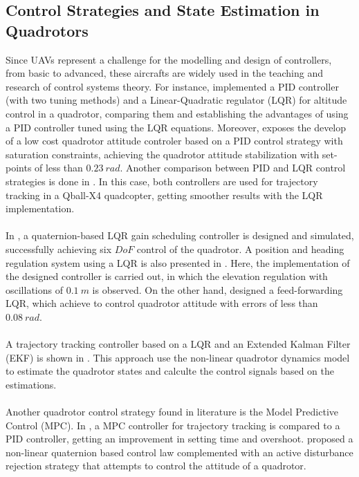 \subsection{Control Strategies and State Estimation in Quadrotors}
Since UAVs represent a challenge for the modelling and design of controllers, from basic to advanced, these aircrafts are widely used in the teaching and research of control systems theory. For instance, \cite{Argentim2013} implemented a PID controller (with two tuning methods) and a Linear-Quadratic regulator (LQR) for altitude control in a quadrotor, comparing them and establishing the advantages of using a PID controller tuned using the LQR equations. Moreover, \cite{Silva2016} exposes the develop of a low cost quadrotor attitude controler based on a PID control strategy with saturation constraints, achieving the quadrotor attitude stabilization with set-points of less than $0.23\ rad$. Another comparison between PID and LQR control strategies is done in \cite{Liu2016}. In this case, both controllers are used for trajectory tracking in a Qball-X4 quadcopter, getting smoother results with the LQR implementation.
\\\\
In \cite{Reyes-Valeria2013}, a quaternion-based LQR gain scheduling controller is designed and simulated, successfully achieving six $DoF$ control of the quadrotor. A position and heading regulation system using a LQR is also presented in \cite{Dong2015}. Here, the implementation of the designed controller is carried out, in which the elevation regulation with oscillations of $0.1\ m$ is observed. On the other hand, \cite{Fan2017} designed a feed-forwarding LQR, which achieve to control quadrotor attitude with errors of less than $0.08\ rad$.
\\\\
A trajectory tracking controller based on a LQR and an Extended Kalman Filter (EKF) is shown in \cite{Zhang2016}. This approach use the non-linear quadrotor dynamics model to estimate the quadrotor states and calculte the control signals based on the estimations.
\\\\
Another quadrotor control strategy found in literature is the Model Predictive Control (MPC). In \cite{Configuration2017}, a MPC controller for trajectory tracking is compared to a PID controller, getting an improvement in setting time and overshoot. \cite{Castillo201603a} proposed a non-linear quaternion based control law complemented with an active disturbance rejection strategy that attempts to control the attitude of a quadrotor.
